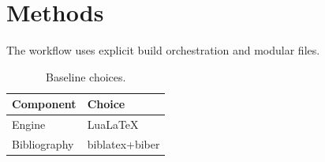 \chapter{Methods}
The workflow uses explicit build orchestration and modular files.

\begin{table}[htbp]
\centering
\begin{tabular}{ll}
\toprule
Component & Choice \\
\midrule
Engine & LuaLaTeX \\
Bibliography & biblatex+biber \\
\bottomrule
\end{tabular}
\caption{Baseline choices.}
\label{tab:baseline}
\end{table}
